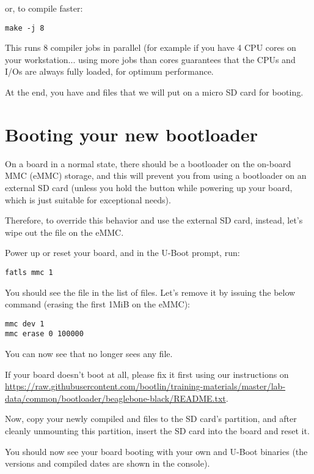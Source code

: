or, to compile faster:

\begin{verbatim}
make -j 8
\end{verbatim}

This runs 8 compiler jobs in parallel (for example if you have 4 CPU
cores on your workstation... using more jobs than cores guarantees that
the CPUs and I/Os are always fully loaded, for optimum performance.

At the end, you have  and  files that we will
put on a micro SD card for booting.




\section{Booting your new bootloader}

On a board in a normal state, there should be a bootloader on the on-board MMC
(eMMC) storage, and this will prevent you from using a bootloader on an
external SD card (unless you hold the  button while powering
up your board, which is just suitable for exceptional needs).

Therefore, to override this behavior and use the external SD card,
instead, let's wipe out the  file on the eMMC.

Power up or reset your board, and in the U-Boot prompt, run:

\begin{verbatim}
fatls mmc 1
\end{verbatim}

You should see the  file in the list of files. Let's remove it
by issuing the below command (erasing the first 1MiB on the eMMC):

\begin{verbatim}
mmc dev 1
mmc erase 0 100000
\end{verbatim}

You can now see that  no longer sees any file.

If your board doesn't boot at all, please fix it first using our instructions
on
\url{https://raw.githubusercontent.com/bootlin/training-materials/master/lab-data/common/bootloader/beaglebone-black/README.txt}.

Now, copy your newly compiled  and  files to
the SD card's  partition, and after cleanly unmounting this
partition, insert the SD card into the board and reset it.

You should now see your board booting with your own  and U-Boot
binaries (the versions and compiled dates are shown in the console).
